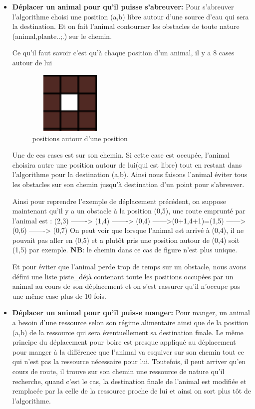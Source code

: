 \documentclass[a4paper,12pt]{article} %
\begin{document}
\begin{itemize}
    \item \textbf{Déplacer un animal pour qu'il puisse s'abreuver: } Pour s'abreuver l'algorithme choisi une position (a,b) libre autour d'une source d'eau qui sera la destination.
Et on fait l'animal contourner les obstacles de toute nature (animal,plante..;.) sur le chemin.

Ce qu'il faut savoir c'est qu'à chaque position d'un animal, il y a 8 cases autour de lui

\begin{figure}[h]
    \centering
    \includegraphics[width=4cm, height=3cm]{images/cases.png}
    \caption{positions autour d'une position}
\end{figure}

Une de ces cases est sur son chemin. Si cette case est occupée, l'animal choisira autre une position autour de lui(qui est libre) tout en restant dans l'algorithme pour la destination (a,b).
Ainsi nous faisons l'animal éviter tous les obstacles sur son chemin jusqu'à destination d'un point pour s'abreuver.

Ainsi pour reprendre l'exemple de déplacement précédent, on suppose maintenant qu'il y a un obstacle à la position (0,5), une route emprunté par l'animal est :
(2,3) -------> (1,4) -------> (0,4) ------>(0+1,4+1)=(1,5) ------> (0,6) -------> (0,7)
On peut voir que lorsque l'animal est arrivé à (0,4), il ne pouvait pas aller en (0,5) et a plutôt pris une position autour de (0,4) soit (1,5) par exemple.
\textbf{NB}: le chemin dans ce cas de figure n'est plus unique.

Et pour éviter que l'animal perde trop de temps sur un obstacle, nous avons défini une liste piste\_déjà contenant toute les positions occupées par un animal au cours de son déplacement et on s'est rassurer qu'il n'occupe pas une même case plus de 10 fois.

    \item \textbf{Déplacer un animal pour qu'il puisse manger: } Pour manger, un animal a besoin d'une ressource selon son régime alimentaire ainsi que de la position (a,b) de la ressource qui sera éventuellement sa destination finale.
    Le même principe du déplacement pour boire est presque appliqué au déplacement pour manger à la différence que l'animal va esquiver sur son chemin tout ce qui n'est pas la ressource nécessaire pour lui. Toutefois, il peut arriver qu'en cours de route, il trouve sur son chemin une ressource de nature qu'il recherche, quand c'est le cas, la destination finale de l'animal est modifiée et remplacée par la celle de la ressource proche de lui et ainsi on sort plus tôt  de l'algorithme.
\end{itemize}
\end{document}
